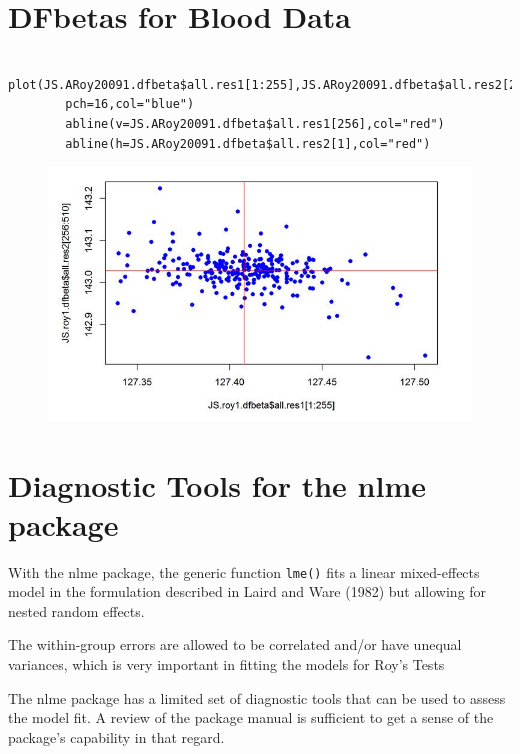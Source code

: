 \documentclass[12pt, a4paper]{report}
\theoremstyle{plain}
\theoremstyle{definition}
\theoremstyle{remark}
\begin{document}
	
	
	\newpage
	
	
	
	
	\section{DFbetas for Blood Data}
	\begin{framed}
		\begin{verbatim}
		plot(JS.ARoy20091.dfbeta$all.res1[1:255],JS.ARoy20091.dfbeta$all.res2[256:510],
		pch=16,col="blue")
		abline(v=JS.ARoy20091.dfbeta$all.res1[256],col="red")
		abline(h=JS.ARoy20091.dfbeta$all.res2[1],col="red")
		\end{verbatim}
	\end{framed}
	\begin{figure}
		\centering
		\includegraphics[width=0.7\linewidth]{images/dfbetas-JS-Roy}
		\caption{}
		\label{fig:dfbetas-JS-ARoy2009}
	\end{figure}
	

\section{Diagnostic Tools for the nlme package}


With the nlme package, the generic function \texttt{lme()} fits a linear mixed-effects model in the formulation described in Laird and Ware (1982) but allowing for nested random effects. 

The within-group errors are allowed to be correlated and/or have unequal variances, which is very important in fitting the models for Roy's Tests

The nlme package has a limited set of diagnostic tools that can be used to assess the model fit. A review of the package manual is sufficient to get a sense of the package's capability in that regard.
\end{document}
